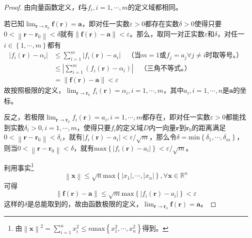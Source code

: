 \documentclass[main.tex]{subfiles}
\begin{document}
\begin{proof}
    由向量函数定义，$\mathbf{f}$与$f_i,i=1,\cdots,m$的定义域都相同。

    若已知$\lim_{\mathbf{r}\to\mathbf{r}_0}\mathbf{f}\left(\mathbf{r}\right)=\mathbf{a}$，即对任一实数$\varepsilon>0$都存在实数$\delta>0$使得只要$0<\left\|\mathbf{r}-\mathbf{r}_0\right\|<\delta$就有$\left\|\mathbf{f}\left(\mathbf{r}\right)-\mathbf{a}\right\|<\varepsilon$。那么，取同一对正实数$\varepsilon$和$\delta$，对任一$i\in\left\{1,\cdots,m\right\}$都有
    \begin{align*}
        \left|f_i\left(\mathbf{r}\right)-\alpha_i\right| & \leq\sum_{i=1}^m\left|f_i\left(\mathbf{r}\right)-a_i\right|\quad\text{（当}m=1\text{或}f_j=a_j\forall j\neq i\text{时取等号。）} \\
                                                         & \leq\left|\sum_{i=1}^m\left(f_i\left(\mathbf{r}\right)-\alpha_i\right)\right|\quad\text{（三角不等式。）}                       \\
                                                         & =\left\|\mathbf{f}\left(\mathbf{r}\right)-\mathbf{a}\right\|<\varepsilon
    \end{align*}
    故按照极限的定义，$\lim_{\mathbf{r}\to\mathbf{r}_0}f_i\left(\mathbf{r}\right)=\alpha_i,i=1,\cdots,m$，其中$a_i,i=1,\cdots,n$是$\mathbf{a}$的坐标。

    反之，若极限$\lim_{\mathbf{r}\to\mathbf{r}_0}f_i\left(\mathbf{r}\right)=a_i,i=1,\cdots,m$都存在，即对任一实数$\varepsilon>0$都能找到实数$\delta_i>0,i=1,\cdots,m$，使得只要$f_i$的定义域$D$内一向量$\mathbf{r}$到$\mathbf{r}_0$的距离满足$0<\left\|\mathbf{r}-\mathbf{r}_0\right\|<\delta_i$，就有$\left|f_i\left(\mathbf{r}\right)-a_i\right|<\varepsilon/\sqrt{m}$，那么令$\delta=\mathrm{min}\left\{\delta_1,\cdots,\delta_m\right\}$，则当$0<\left\|\mathbf{r}-\mathbf{r}_0\right\|<\delta$，就有$\mathrm{max}\left\{\left|f_i\left(\mathbf{r}\right)-a_i\right|\right\}<\varepsilon/\sqrt{m}$。

    利用事实\footnote{
        由$\left\|\mathbf{x}\right\|^2=\sum_{i=1}^nx_i^2\leq n\mathrm{max}\left\{x_1^2,\cdots,x_n^2\right\}$得到。
    }
    \[\left\|\mathbf{x}\right\|\leq\sqrt{n}\mathrm{max}\left\{\left|x_1\right|,\cdots,\left|x_n\right|\right\},\forall\mathbf{x}\in\mathbb{R}^n\]
    可得
    \[\left\|\mathbf{f}\left(\mathbf{r}\right)-\mathbf{a}\right\|\leq\sqrt{m}\mathrm{max}\left\{\left|f_i\left(\mathbf{r}\right)-a_i\right|\right\}<\varepsilon\]
    这样的$\delta$是总能取到的，故由函数极限的定义，$\lim_{\mathbf{r}\to\mathbf{r}_0}\mathbf{f}\left(\mathbf{r}\right)=\mathbf{a}$。
\end{proof}
\end{document}
